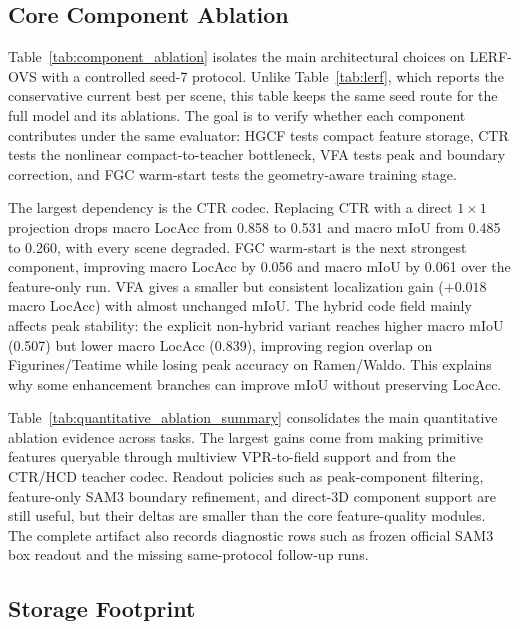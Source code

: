 \documentclass[10pt,twocolumn,letterpaper]{article}
\begin{document}
\subsection{Core Component Ablation}





Table~\ref{tab:component_ablation} isolates the main architectural choices on
LERF-OVS with a controlled seed-7 protocol. Unlike Table~\ref{tab:lerf}, which
reports the conservative current best per scene, this table keeps the same seed
route for the full model and its ablations. The goal is to verify whether each
component contributes under the same evaluator: HGCF tests compact feature
storage, CTR tests the nonlinear compact-to-teacher bottleneck, VFA tests peak
and boundary correction, and FGC warm-start tests the geometry-aware training
stage.

The largest dependency is the CTR codec. Replacing CTR with a direct $1\times1$
projection drops macro LocAcc from 0.858 to 0.531 and macro mIoU from 0.485 to
0.260, with every scene degraded. FGC warm-start is the next strongest
component, improving macro LocAcc by 0.056 and macro mIoU by 0.061 over the
feature-only run. VFA gives a smaller but consistent localization gain
($+0.018$ macro LocAcc) with almost unchanged mIoU. The hybrid code field
mainly affects peak stability: the explicit non-hybrid variant reaches higher
macro mIoU (0.507) but lower macro LocAcc (0.839), improving region overlap on
Figurines/Teatime while losing peak accuracy on Ramen/Waldo. This explains why
some enhancement branches can improve mIoU without preserving LocAcc.

Table~\ref{tab:quantitative_ablation_summary} consolidates the main quantitative
ablation evidence across tasks. The largest gains come from making primitive
features queryable through multiview VPR-to-field support and from the CTR/HCD
teacher codec. Readout policies such as peak-component filtering, feature-only
SAM3 boundary refinement, and direct-3D component support are still useful, but
their deltas are smaller than the core feature-quality modules. The complete
artifact also records diagnostic rows such as frozen official SAM3 box readout
and the missing same-protocol follow-up runs.

\subsection{Storage Footprint}
\end{document}
